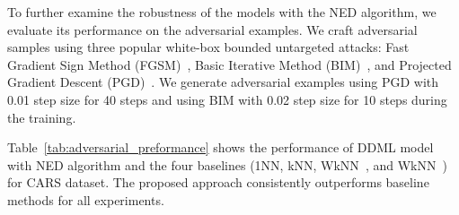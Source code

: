 \documentclass{article}
\begin{document}
To further examine the robustness of the models with the NED algorithm, we evaluate its performance on the adversarial examples. We craft adversarial samples using three popular white-box  bounded untargeted attacks:
Fast Gradient Sign Method (FGSM)~\cite{b53},  Basic Iterative Method (BIM)~\cite{b57}, and Projected Gradient Descent (PGD)~\cite{b54}. We generate adversarial examples using PGD with 0.01 step size for 40 steps and using BIM with 0.02 step size for 10 steps during the training.

Table~\ref{tab:adversarial_preformance} shows the performance of DDML model with NED algorithm and the four baselines (1NN, kNN, WkNN~\cite{b70}, and WkNN~\cite{b69}) for CARS dataset. The proposed approach consistently outperforms baseline methods for all experiments.

\begin{table*}[h]
	\begin{center}
		\caption{The accuracy (A.) and ECE (E.) for DDML model complemented with NED algorithm for adversarial images. The model with NED algorithm is more robust to adversarial images compared to the baselines.}
		\label{tab:adversarial_preformance}
	\end{center}
\end{table*}
\end{document}
